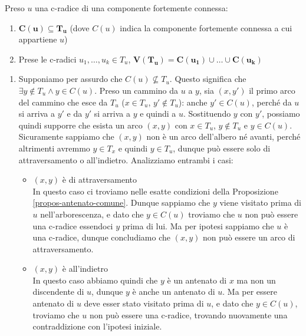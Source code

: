 \documentclass[11pt, a4paper, titlepage, oneside]{scrbook}
\begin{document}
\begin{Proposizione}[]
\label{propos-c-radice}
Preso $u$ una c-radice di una componente fortemente connessa:
\begin{enumerate}
    \item $\bm{C(u) \subseteq T_u}$ (dove $C(u)$ indica la componente fortemente connessa a cui appartiene $u$)
    \item Prese le c-radici $u_1, \ldots, u_k \in T_u$, $\bm{V(T_u) = C(u_1) \cup \ldots \cup C(u_k)}$
\end{enumerate}
\end{Proposizione}

\vspace{2cm}

\Dimostrazione \nopagebreak

\begin{enumerate}
    \item Supponiamo per assurdo che $C(u) \nsubseteq T_u$. Questo significa che $\exists y \notin T_u \land y \in C(u)$. Preso un cammino da $u$ a $y$, sia $(x,y')$ il primo arco del cammino che esce da $T_u$ ($x \in T_u$, $y' \notin T_u$): anche $y' \in C(u)$, perché da $u$ si arriva a $y'$ e da $y'$ si arriva a $y$ e quindi a $u$. Sostituendo $y$ con $y'$, possiamo quindi supporre che esista un arco $(x,y)$ con $x \in T_u$, $y \notin T_u$ e $y \in C(u)$. Sicuramente sappiamo che $(x,y)$ non è un arco dell'albero né avanti, perché altrimenti avremmo $y \in T_x$ e quindi $y \in T_u$, dunque può essere solo di attraversamento o all'indietro. Analizziamo entrambi i casi:
    \begin{itemize}
        \item $(x,y)$ è di attraversamento \\
        In questo caso ci troviamo nelle esatte condizioni della Proposizione \ref{propos-antenato-comune}. Dunque sappiamo che $y$ viene visitato prima di $u$ nell'arborescenza, e dato che $y \in C(u)$ troviamo che $u$ non può essere una c-radice essendoci $y$ prima di lui. Ma per ipotesi sappiamo che $u$ è una c-radice, dunque concludiamo che $(x,y)$ non può essere un arco di attraversamento.
        \item $(x,y)$ è all'indietro \\
        In questo caso abbiamo quindi che $y$ è un antenato di $x$ ma non un discendente di $u$, dunque $y$ è anche un antenato di $u$. Ma per essere antenato di $u$ deve esser stato visitato prima di $u$, e dato che $y \in C(u)$, troviamo che $u$ non può essere una c-radice, trovando nuovamente una contraddizione con l'ipotesi iniziale.

\end{itemize}
\end{enumerate}
\end{document}
